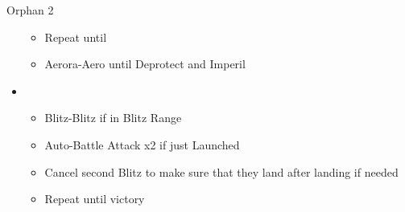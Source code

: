 \begin{battle}[1:05]{Orphan 2}
\begin{multicols}{2}
\begin{itemize}
			\begin{itemize}
				\item Repeat until \stagger
				\item Aerora-Aero until Deprotect and Imperil
			\end{itemize}
			\item \first
			      \begin{itemize}
				      \item Blitz-Blitz if in Blitz Range
				      \item Auto-Battle Attack x2 if just Launched
				      \item Cancel second Blitz to make sure that they land after landing if needed
				      \item Repeat until victory
			      \end{itemize}
		\end{itemize}
	\end{multicols}
\end{battle}
